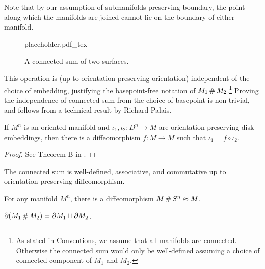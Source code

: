 \begin{remark}
	Note that by our assumption of submanifolds preserving boundary, the point along which the manifolds are joined cannot lie on the boundary of either manifold.
\end{remark}

\begin{figure}[ht]
	\centering
	{placeholder.pdf_tex}
	\caption{A connected sum of two surfaces.}\label{fig:connected-sum}
\end{figure}

This operation is (up to orientation-preserving orientation) independent of the choice of embedding, justifying the basepoint-free notation of $M_1\+ M_2$.\footnote{As stated in Conventions, we assume that all manifolds are connected. Otherwise the connected sum would only be well-defined assuming a choice of connected component of $M_1$ and $M_2$.}
Proving the independence of connected sum from the choice of basepoint is non-trivial, and follows from a technical result by Richard Palais.

\begin{theorem}\label{thm:disk}
	If $M^n$ is an oriented manifold and $\iota_1, \iota_2 : D^n \to M$ are orientation-preserving disk embeddings, then there is a diffeomorphism $f : M \to M$ such that $\iota_1 = f\circ \iota_2$.
\end{theorem}
\begin{proof}
	See Theorem B in \cite{palais1960diffeomorphism}.
\end{proof}

\begin{corollary}\label{cor:connected-sum-operation}
		The connected sum is well-defined, associative, and commutative up to orientation-preserving diffeomorphism.
\end{corollary}

\begin{corollary}
	For any manifold $M^n$, there is a diffeomorphism $M\+ S^n\cong M$.
\end{corollary}

\begin{corollary}
	$\partial(M_1\+M_2) = \partial M_1\sqcup \partial M_2$.
\end{corollary}

